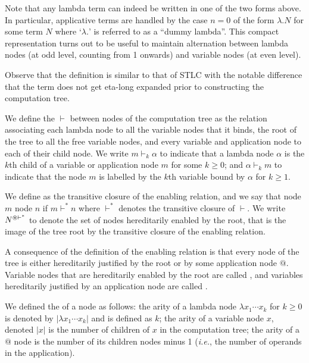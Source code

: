\documentclass{article}
\makeatletter
\theoremstyle{definition}
\newcommand\Nodes{N}%
\newcommand{\enables}{\vdash}
\newcommand{\NodeHjByRoot}{\Nodes^{\theroot\enables^*}}
\renewcommand\ie{{\it i.e.\@\xspace}}
\makeatother
\begin{document}
Note that any lambda term can indeed be written in one of the two forms above. In particular, applicative terms are handled by the case $n=0$ of the form $\lambda . N$ for some term $N$ where `$\lambda.$' is referred to as a ``dummy lambda''. This compact representation turns out to be useful to maintain alternation between lambda nodes (at odd level, counting from 1 onwards) and variable nodes (at even level).

Observe that the definition is similar to that of STLC \cite{Ong2006, BlumPhd} with the notable difference that the term does not get eta-long expanded prior to constructing the computation tree.

We define the  $\enables$ between nodes of the computation tree as the relation associating each lambda node to all the variable nodes that it binds, the root of the tree to all the free variable nodes, and every variable and application node to each of their child node. We write $m \enables_k \alpha$ to indicate that a lambda node $\alpha$ is the $k$th child of a variable or application node $m$ for some $k\geq0$; and $\alpha \enables_k m$ to indicate that the node $m$ is labelled by the $k$th variable bound by $\alpha$ for $k\geq1$. 

We define  as the transitive closure of the enabling relation, and we say that node $m$  node $n$ if $m \enables^* n$ where $\enables^*$ denotes the transitive closure of $\enables$. We write $\NodeHjByRoot$ to denote the set of nodes hereditarily enabled by the root, that is the image of the tree root by the transitive closure of the enabling relation.

A consequence of the definition of the enabling relation is that every node of the tree is either hereditarily justified by the root or by some application node $@$.  Variable nodes that are hereditarily enabled by the root are called , and variables hereditarily justified by an application node are called .

We defined the  of a node as follows: the arity of a lambda node $\lambda x_1 \cdots x_k$ for $k\geq 0$ is denoted by $|\lambda x_1 \cdots x_k|$ and is defined as $k$; the arity of a variable node $x$, denoted $|x|$ is the number of children of $x$ in the computation tree; the arity of a $@$ node is the number of its children nodes minus 1 (\ie, the number of operands in the application).
\end{document}
